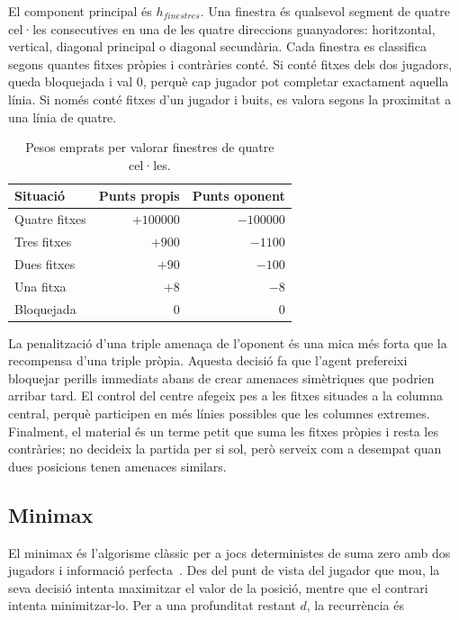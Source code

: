 \documentclass[conference,compsoc]{IEEEtran}
\begin{document}
El component principal és $h_{finestres}$. Una finestra és qualsevol segment de
quatre cel·les consecutives en una de les quatre direccions guanyadores:
horitzontal, vertical, diagonal principal o diagonal secundària. Cada finestra es
classifica segons quantes fitxes pròpies i contràries conté. Si conté fitxes dels
dos jugadors, queda bloquejada i val 0, perquè cap jugador pot completar exactament
aquella línia. Si només conté fitxes d'un jugador i buits, es valora segons la
proximitat a una línia de quatre.

\begin{table}[H]
\centering
\caption{Pesos emprats per valorar finestres de quatre cel·les.}
\label{tab:window-weights}
\begin{tabular}{lrr}
\toprule
Situació & Punts propis & Punts oponent \\
\midrule
Quatre fitxes & $+100000$ & $-100000$ \\
Tres fitxes & $+900$ & $-1100$ \\
Dues fitxes & $+90$ & $-100$ \\
Una fitxa & $+8$ & $-8$ \\
Bloquejada & $0$ & $0$ \\
\bottomrule
\end{tabular}
\end{table}

La penalització d'una triple amenaça de l'oponent és una mica més forta que la
recompensa d'una triple pròpia. Aquesta decisió fa que l'agent prefereixi bloquejar
perills immediats abans de crear amenaces simètriques que podrien arribar tard.
El control del centre afegeix pes a les fitxes situades a la columna central,
perquè participen en més línies possibles que les columnes extremes. Finalment,
el material és un terme petit que suma les fitxes pròpies i resta les contràries;
no decideix la partida per si sol, però serveix com a desempat quan dues posicions
tenen amenaces similars.

\subsection{Minimax}

El minimax és l'algorisme clàssic per a jocs deterministes de suma zero amb dos
jugadors i informació perfecta~\cite{ref_gfg_minimax}. Des del punt de vista del jugador
que mou, la seva decisió intenta maximitzar el valor de la posició, mentre que el
contrari intenta minimitzar-lo. Per a una profunditat restant $d$, la recurrència
és
\end{document}
